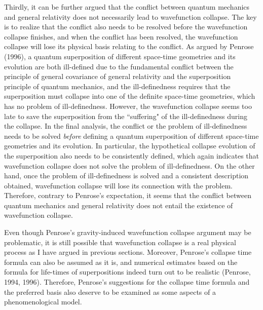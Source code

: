Thirdly, it can be further argued that the conflict between quantum mechanics and general relativity does not necessarily lead to wavefunction collapse. The key is to realize that the conflict also needs to be resolved before the wavefunction collapse finishes, and when the conflict has been resolved, the wavefunction collapse will lose its physical basis relating to the conflict. As argued by Penrose (1996), a quantum superposition of different space-time geometries and its evolution are both ill-defined due to the fundamental conflict between the principle of general covariance of general relativity and the superposition principle of quantum mechanics, and the ill-definedness requires that the superposition must collapse into one of the definite space-time geometries, which has no problem of ill-definedness. However, the wavefunction collapse seems too late to save the superposition from the ``suffering" of the ill-definedness during the collapse. In the final analysis, the conflict or the problem of ill-definedness needs to be solved \emph{before} defining a quantum superposition of different space-time geometries and its evolution. In particular, the hypothetical collapse evolution of the superposition also needs to be consistently defined, which again indicates that wavefunction collapse does not solve the problem of ill-definedness. On the other hand, once the problem of ill-definedness is solved and a consistent description obtained, wavefunction collapse will lose its connection with the problem. Therefore, contrary to Penrose's expectation, it seems that the conflict between quantum mechanics and general relativity does not entail the existence of wavefunction collapse.

Even though Penrose's gravity-induced wavefunction collapse argument may be problematic, it is still possible that wavefunction collapse is a real physical process as I have argued in previous sections. Moreover, Penrose's collapse time formula can also be assumed as it is, and numerical estimates based on the formula for life-times of superpositions indeed turn out to be realistic (Penrose, 1994, 1996). Therefore, Penrose's suggestions for the collapse time formula and the preferred basis also deserve to be examined as some aspects of a phenomenological model.

